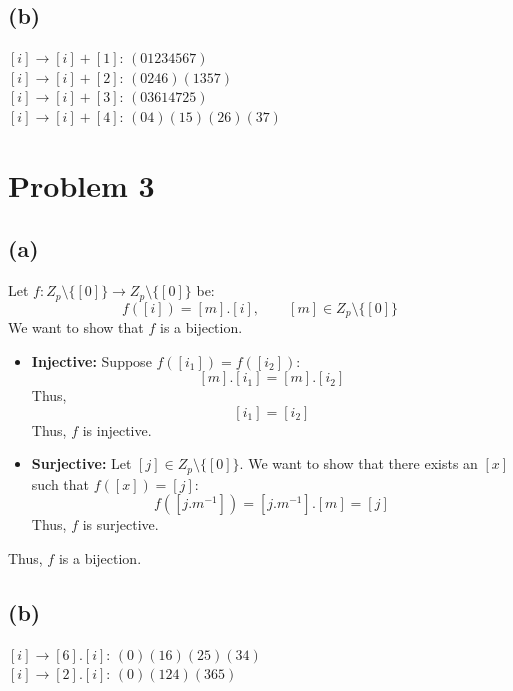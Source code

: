 \documentclass{article}
\begin{document}
\subsection*{(b)}
\([i] \rightarrow [i] + [1]\):
\(
   (01234567)
\)
\\
\([i] \rightarrow [i] + [2]\):
\(
   (0246)(1357)
\)
\\
\([i] \rightarrow [i] + [3]\):
\(
   (03614725)
\)
\\
\([i] \rightarrow [i] + [4]\):
\(
   (04)(15)(26)(37)
\)

\section*{Problem 3}


\subsection*{(a)}

Let \(f: Z_p \setminus \{[0]\} \to Z_p \setminus \{[0]\}\) be:
\[
   f([i]) = [m].[i], \qquad [m] \in Z_p \setminus \{[0]\}
\]
We want to show that \(f\) is a bijection.
\begin{itemize}
   \item \textbf{Injective:} Suppose \(f([i_1]) = f([i_2])\):
   \[
      [m].[i_1] = [m].[i_2]
   \]
   Thus,
   \[
      [i_1] = [i_2]
   \]
   Thus, \(f\) is injective.
   \item \textbf{Surjective:} Let \([j] \in Z_p \setminus \{[0]\}\). We want to show that there exists an \([x]\) such that \(f([x]) = [j]\):
   \[
      f([j . m^{-1}]) = [j . m^{-1}] . [m] = [j]
   \]
   Thus, \(f\) is surjective.
\end{itemize}
Thus, \(f\) is a bijection.

\subsection*{(b)}
\([i] \rightarrow [6].[i]\):
\(
   (0)(16)(25)(34)
\)
\\
\([i] \rightarrow [2].[i]\):
\(
   (0)(124)(365)
\)
\end{document}
